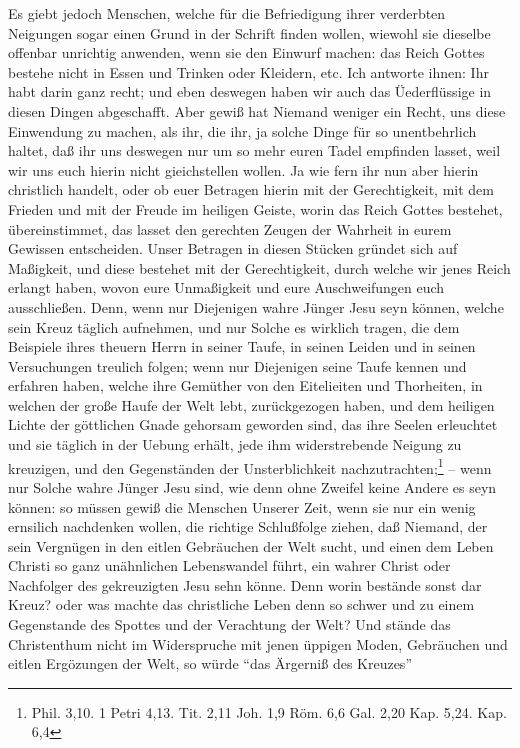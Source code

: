 Es giebt jedoch Menschen, welche für die Befriedigung ihrer verderbten Neigungen
sogar einen Grund in der Schrift finden wollen, wiewohl sie dieselbe offenbar
unrichtig anwenden, wenn sie den Einwurf machen: das Reich Gottes bestehe nicht
in Essen und Trinken oder Kleidern, etc. Ich antworte ihnen: Ihr habt darin ganz
recht; und eben deswegen haben wir auch das Üederflüssige in diesen Dingen
abgeschafft. Aber gewiß hat Niemand weniger ein Recht, uns diese Einwendung zu
machen, als ihr, die ihr, ja solche Dinge für so unentbehrlich haltet, daß ihr
uns deswegen nur um so mehr euren Tadel empfinden lasset, weil wir uns euch
hierin nicht gieichstellen wollen. Ja wie fern ihr nun aber hierin christlich
handelt, oder ob euer Betragen hierin mit der Gerechtigkeit, mit dem Frieden und
mit der Freude im heiligen Geiste, worin das Reich Gottes bestehet,
übereinstimmet, das lasset den gerechten Zeugen der Wahrheit in eurem Gewissen
entscheiden. Unser Betragen in diesen Stücken gründet sich auf Maßigkeit, und
diese bestehet mit der Gerechtigkeit, durch welche wir jenes Reich erlangt
haben, wovon eure Unmaßigkeit und eure Auschweifungen euch ausschließen. Denn,
wenn nur Diejenigen wahre Jünger Jesu seyn können, welche sein Kreuz täglich
aufnehmen, und nur Solche es wirklich tragen, die dem Beispiele ihres theuern
Herrn in seiner Taufe, in seinen Leiden und in seinen Versuchungen treulich
folgen; wenn nur Diejenigen seine Taufe kennen und erfahren haben, welche ihre
Gemüther von den Eitelieiten und Thorheiten, in welchen der große Haufe der Welt
lebt, zurückgezogen haben, und dem heiligen Lichte der göttlichen Gnade gehorsam
geworden sind, das ihre Seelen erleuchtet und sie täglich in der Uebung erhält,
jede ihm widerstrebende Neigung zu kreuzigen, und den Gegenständen der
Unsterblichkeit nachzutrachten;\footnote{Phil. 3,10. 1 Petri 4,13. Tit. 2,11
Joh. 1,9 Röm. 6,6 Gal. 2,20 Kap. 5,24. Kap. 6,4} -- wenn nur Solche wahre Jünger
Jesu sind, wie denn ohne Zweifel keine Andere es seyn können: so müssen gewiß
die Menschen Unserer Zeit, wenn sie nur ein wenig ernsilich nachdenken wollen,
die richtige Schlußfolge ziehen, daß Niemand, der sein Vergnügen in den eitlen
Gebräuchen der Welt sucht, und einen dem Leben Christi so ganz unähnlichen
Lebenswandel führt, ein wahrer Christ oder Nachfolger des gekreuzigten Jesu sehn
könne. Denn worin bestände sonst dar Kreuz? oder was machte das christliche
Leben denn so schwer und zu einem Gegenstande des Spottes und der Verachtung der
Welt? Und stände das Christenthum nicht im Widerspruche mit jenen üppigen Moden,
Gebräuchen und eitlen Ergözungen der Welt, so würde "`das Ärgerniß des Kreuzes"'

